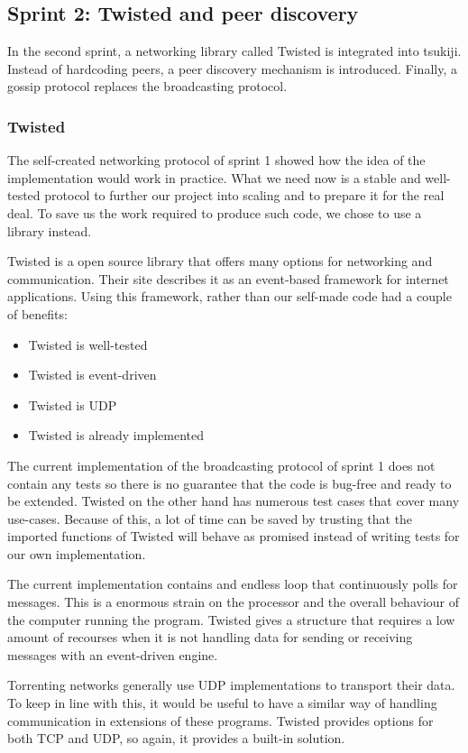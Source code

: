 \subsection{Sprint 2: Twisted and peer discovery}
In the second sprint, a networking library called Twisted is integrated into tsukiji. Instead of hardcoding peers, a peer discovery mechanism is introduced. Finally, a gossip protocol replaces the broadcasting protocol.

\subsubsection{Twisted}
The self-created networking protocol of sprint 1 showed how the idea of the implementation would work in practice.
What we need now is a stable and well-tested protocol to further our project into scaling and to prepare it for the real deal.
To save us the work required to produce such code, we chose to use a library instead.

Twisted is a open source library that offers many options for networking and communication. 
Their site describes it as an event-based framework for internet applications. Using this framework, rather than our self-made code had a couple of benefits:
\begin{itemize}
\item Twisted is well-tested
\item Twisted is event-driven
\item Twisted is UDP
\item Twisted is already implemented
\end{itemize}
The current implementation of the broadcasting protocol of sprint 1 does not contain any tests so there is no guarantee that the code is bug-free and ready to be extended.
Twisted on the other hand has numerous test cases that cover many use-cases.
Because of this, a lot of time can be saved by trusting that the imported functions of Twisted will behave as promised instead of writing tests for our own implementation.

The current implementation contains and endless loop that continuously polls for messages.
This is a enormous strain on the processor and the overall behaviour of the computer running the program.
Twisted gives a structure that requires a low amount of recourses when it is not handling data for sending or receiving messages with an event-driven engine.

Torrenting networks generally use UDP implementations to transport their data.
To keep in line with this, it would be useful to have a similar way of handling communication in extensions of these programs.
Twisted provides options for both TCP and UDP, so again, it provides a built-in solution.

